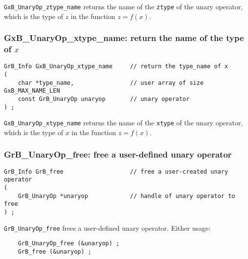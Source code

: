 \documentclass[12pt]{article}
\begin{document}
{\verb'GxB_UnaryOp_ztype_name' returns the name of the \verb'ztype' of the unary
operator, which is the type of $z$ in the function $z=f(x)$.

\subsubsection{{\sf GxB\_UnaryOp\_xtype\_name:} return the name of the type of $x$}
\label{unaryop_xtype_name}

\begin{mdframed}[userdefinedwidth=6in]
{\footnotesize
\begin{verbatim}
GrB_Info GxB_UnaryOp_xtype_name     // return the type_name of x
(
    char *type_name,                // user array of size GxB_MAX_NAME_LEN
    const GrB_UnaryOp unaryop       // unary operator
) ;
\end{verbatim}
}\end{mdframed}

\verb'GxB_UnaryOp_xtype_name' returns the name of the \verb'xtype' of the unary
operator, which is the type of $x$ in the function $z=f(x)$.

\subsubsection{{\sf GrB\_UnaryOp\_free:} free a user-defined unary operator}
\label{unaryop_free}

\begin{mdframed}[userdefinedwidth=6in]
{\footnotesize
\begin{verbatim}
GrB_Info GrB_free                   // free a user-created unary operator
(
    GrB_UnaryOp *unaryop            // handle of unary operator to free
) ;
\end{verbatim}
}\end{mdframed}

\verb'GrB_UnaryOp_free' frees a user-defined unary operator.
Either usage:

    {\small
    \begin{verbatim}
    GrB_UnaryOp_free (&unaryop) ;
    GrB_free (&unaryop) ; \end{verbatim}}

}
\end{document}
